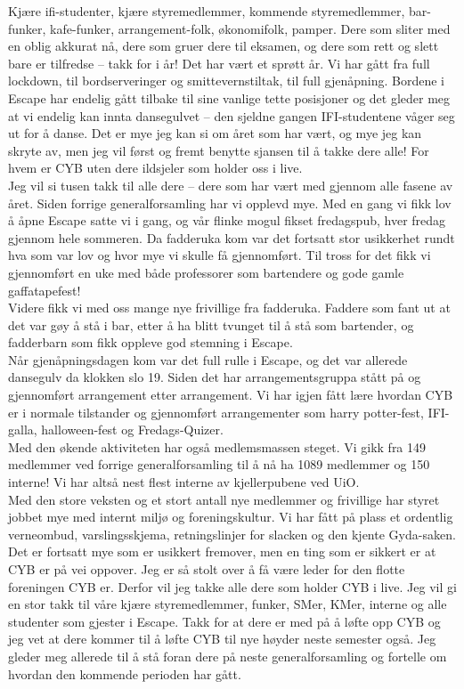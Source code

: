 \documentclass[10pt,norsk,a4paper,usenames,dvipsnames]{article}
\begin{document}
\begin{multicols}{2}
Kjære ifi-studenter, kjære styremedlemmer, kommende styremedlemmer, bar-funker, kafe-funker, arrangement-folk, økonomifolk, pamper. Dere som sliter med en oblig akkurat nå, dere som gruer dere til eksamen, og dere som rett og slett bare er tilfredse – takk for i år! Det har vært et sprøtt år. Vi har gått fra full lockdown, til bordserveringer og smittevernstiltak, til full gjenåpning. Bordene i Escape har endelig gått tilbake til sine vanlige tette posisjoner og det gleder meg at vi endelig kan innta dansegulvet – den sjeldne gangen IFI-studentene våger seg ut for å danse.
Det er mye jeg kan si om året som har vært, og mye jeg kan skryte av, men jeg vil først og fremt benytte sjansen til å takke dere alle! For hvem er CYB uten dere ildsjeler som holder oss i live.\\
Jeg vil si tusen takk til alle dere – dere som har vært med gjennom alle fasene av året. Siden forrige generalforsamling har vi opplevd mye. Med en gang vi fikk lov å åpne Escape satte vi i gang, og vår flinke mogul fikset fredagspub, hver fredag gjennom hele sommeren.
Da fadderuka kom var det fortsatt stor usikkerhet rundt hva som var lov og hvor mye vi skulle få gjennomført. Til tross for det fikk vi gjennomført en uke med både professorer som bartendere og gode gamle gaffatapefest!\\
Videre fikk vi med oss mange nye frivillige fra fadderuka. Faddere som fant ut at det var gøy å stå i bar, etter å ha blitt tvunget til å stå som bartender, og fadderbarn som fikk oppleve god stemning i Escape.\\
Når gjenåpningsdagen kom var det full rulle i Escape, og det var allerede dansegulv da klokken slo 19. Siden det har arrangementsgruppa stått på og gjennomført arrangement etter arrangement. Vi har igjen fått lære hvordan CYB er i normale tilstander og gjennomført arrangementer som harry potter-fest, IFI-galla, halloween-fest og Fredags-Quizer.\\
Med den økende aktiviteten har også medlemsmassen steget. Vi gikk fra 149 medlemmer ved forrige generalforsamling til å nå ha 1089 medlemmer og 150 interne! Vi har altså nest flest interne av kjellerpubene ved UiO.\\
Med den store veksten og et stort antall nye medlemmer og frivillige har styret jobbet mye med internt miljø og foreningskultur. Vi har fått på plass et ordentlig verneombud, varslingsskjema, retningslinjer for slacken og den kjente Gyda-saken.\\
Det er fortsatt mye som er usikkert fremover, men en ting som er sikkert er at CYB er på vei oppover. Jeg er så stolt over å få være leder for den flotte foreningen CYB er. Derfor vil jeg takke alle dere som holder CYB i live. Jeg vil gi en stor takk til våre kjære styremedlemmer, funker, SMer, KMer, interne og alle studenter som gjester i Escape. Takk for at dere er med på å løfte opp CYB og jeg vet at dere kommer til å løfte CYB til nye høyder neste semester også. Jeg gleder meg allerede til å stå foran dere på neste generalforsamling og fortelle om hvordan den kommende perioden har gått.

\end{multicols}
\end{document}
